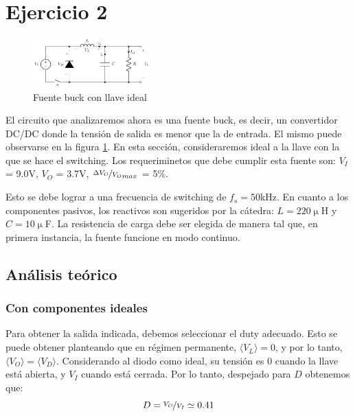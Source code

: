 \documentclass[e4_tp1_main.tex]{subfiles}
\begin{document}
\section{Ejercicio 2}

\begin{figure}
	\centering
	\includegraphics[width=0.4\textwidth]{images/ej2/buck_ideal.pdf}
	\caption{Fuente buck con llave ideal}
	\label{fig:buck-ideal}
\end{figure}

El circuito que analizaremos ahora es una fuente buck, es decir, un convertidor DC/DC donde la tensi\'on de salida es menor que la de entrada. El mismo puede observarse en la figura \ref{fig:buck-ideal}. En esta secci\'on, consideraremos ideal a la llave con la que se hace el switching.
Los requeriminetos que debe cumplir esta fuente son: $V_I$ = 9.0V, $V_O$ = 3.7V, $\nicefrac{\Delta V_O}{V_O}_{max}$ = 5\%.


Esto se debe lograr a una frecuencia de switching de $f_s = 50$kHz. En cuanto a los componentes pasivos, los reactivos son sugeridos por la c\'atedra: $L=220\upmu$H y $C=10\upmu$F. La resistencia de carga  debe ser elegida de manera tal que, en primera instancia, la fuente funcione en modo continuo.



\subsection{An\'alisis te\'orico}

\subsubsection{Con componentes ideales}

Para obtener la salida indicada, debemos seleccionar el duty adecuado. Esto se puede obtener planteando que en r\'egimen permanente, $\langle V_L \rangle = 0$, y por lo tanto, $\langle V_O \rangle = \langle V_D \rangle$. Considerando al diodo como ideal, su tensi\'on es 0 cuando la llave est\'a abierta, y $V_I$ cuando est\'a cerrada. Por lo tanto, despejado para $D$ obtenemos que:
\begin{equation}
	D = \nicefrac{V_O}{V_I} \simeq 0.41
\end{equation}  
\end{document}
